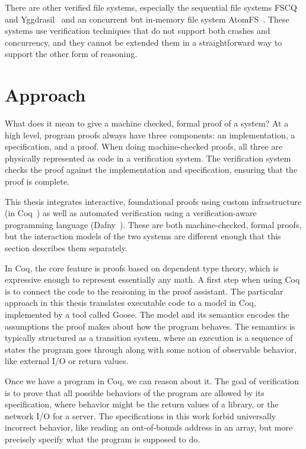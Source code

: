 There are other verified file systems, especially the sequential file systems
FSCQ~\cite{chen:fscq} and Yggdrasil~\cite{sigurbjarnarson:yggdrasil} and an
concurrent but in-memory file system AtomFS~\cite{zou:atomfs}. These systems use
verification techniques that do not support both crashes and concurrency, and they
cannot be extended them in a straightforward way to support the other form of reasoning.

\section{Approach}
\label{sec:intro:approach}

What does it mean to give a machine checked, formal proof of a system? At a high
level, program proofs always have three components: an implementation, a
specification, and a proof. When doing machine-checked proofs, all three are
physically represented as code in a verification system. The verification system
checks the proof against the implementation and specification, ensuring that the
proof is complete.

This thesis integrates interactive, foundational proofs using custom
infrastructure (in Coq~\cite{coq}) as well as automated verification using a
verification-aware programming language (Dafny~\cite{leino:dafny}). These are
both machine-checked, formal proofs, but the interaction models of the two
systems are different enough that this section describes them separately.

In Coq, the core feature is proofs based on dependent type theory, which is
expressive enough to represent essentially any math. A first step when using Coq
is to connect the code to the reasoning in the proof assistant. The particular
approach in this thesis translates executable code to a model in Coq,
implemented by a tool called Goose. The model
and its semantics encodes the
assumptions the proof makes about how the program behaves. The semantics is typically structured as a transition
system, where an execution is a sequence of states the program goes through
along with some notion of observable behavior, like external I/O or return
values. 

Once we have a program in Coq, we can reason about it. The goal of
verification is to prove that all possible behaviors of the program are allowed
by its specification, where behavior might be the return values of a library, or
the network I/O for a server. The
specifications in this work forbid universally incorrect behavior, like reading an
out-of-bounds address in an array, but more precisely specify what the program
is supposed to do.

